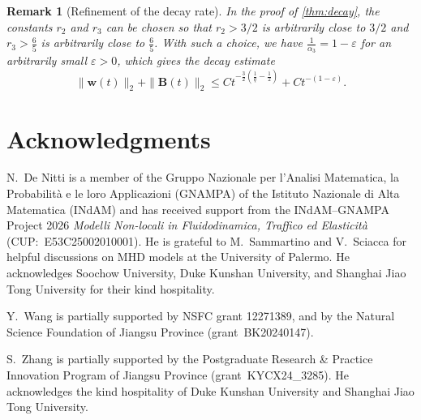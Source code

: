\documentclass[10pt]{amsart}
\theoremstyle{plain}
\newtheorem{remark}[lemma]{Remark}
\theoremstyle{definition}
\theoremstyle{remark}
\numberwithin{equation}{section}
\newcommand{\bw}{{\boldsymbol{w}}}
\newcommand{\bB}{{\boldsymbol{B}}}
\begin{document}
\begin{remark}[Refinement of the decay rate]
In the proof of \cref{thm:decay}, the constants $r_2$ and $r_3$ can be chosen so that $r_2 > 3/2$ is arbitrarily close to $3/2$ and $r_3 > \frac{6}{5}$ is arbitrarily close to $\frac{6}{5}$. With such a choice, we have $\frac{1}{\alpha_3} = 1 - \varepsilon$ for an arbitrarily small $\varepsilon > 0$, which gives the decay estimate
\[
\|\bw(t)\|_2+\|\bB(t)\|_2 \le C t^{-\frac{3}{2}\left(\frac{1}{q}-\frac{1}{2}\right)} + C t^{-(1-\varepsilon)}.
\]
\end{remark}

\vspace{0.5cm}

\section*{Acknowledgments}

N.~De Nitti is a member of the Gruppo Nazionale per l'Analisi Matematica, la Probabilità e le loro Applicazioni (GNAMPA) of the Istituto Nazionale di Alta Matematica (INdAM) and has received support from the INdAM--GNAMPA Project 2026 \textit{Modelli Non-locali in Fluidodinamica, Traffico ed Elasticità} (CUP:~E53C25002010001). He is grateful to M.~Sammartino and V.~Sciacca for helpful discussions on MHD models at the University of Palermo. He acknowledges Soochow University, Duke Kunshan University, and Shanghai Jiao Tong University for their kind hospitality.

Y.~Wang is partially supported by NSFC grant 12271389, and by the Natural Science Foundation of Jiangsu Province (grant~BK20240147).

S.~Zhang is partially supported by the Postgraduate Research \&
Practice Innovation Program of Jiangsu Province (grant~KYCX24\_3285). He acknowledges the kind hospitality of Duke Kunshan University and Shanghai Jiao Tong University.




\vspace{0.5cm}

\printbibliography

\vfill 
\end{document}
